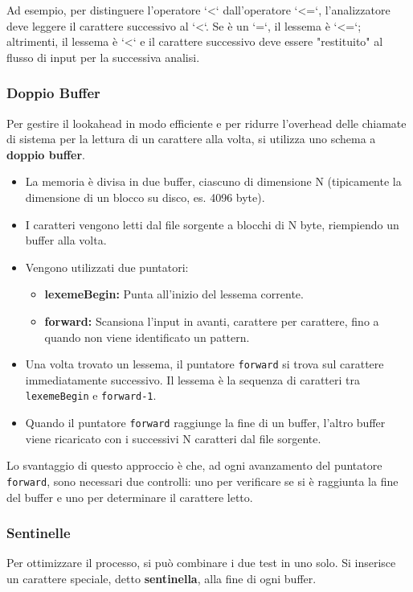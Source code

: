 Ad esempio, per distinguere l'operatore `<` dall'operatore `<=`, l'analizzatore deve leggere il carattere successivo al `<`. Se è un `=`, il lessema è `<=`; altrimenti, il lessema è `<` e il carattere successivo deve essere "restituito" al flusso di input per la successiva analisi.

\subsubsection{Doppio Buffer }
Per gestire il lookahead in modo efficiente e per ridurre l'overhead delle chiamate di sistema per la lettura di un carattere alla volta, si utilizza uno schema a \textbf{doppio buffer}.

\begin{itemize}
    \item La memoria è divisa in due buffer, ciascuno di dimensione N (tipicamente la dimensione di un blocco su disco, es. 4096 byte).
    \item I caratteri vengono letti dal file sorgente a blocchi di N byte, riempiendo un buffer alla volta.
    \item Vengono utilizzati due puntatori:
    \begin{itemize}
        \item \textbf{lexemeBegin:} Punta all'inizio del lessema corrente.
        \item \textbf{forward:} Scansiona l'input in avanti, carattere per carattere, fino a quando non viene identificato un pattern.
    \end{itemize}
    \item Una volta trovato un lessema, il puntatore \texttt{forward} si trova sul carattere immediatamente successivo. Il lessema è la sequenza di caratteri tra \texttt{lexemeBegin} e \texttt{forward-1}.
    \item Quando il puntatore \texttt{forward} raggiunge la fine di un buffer, l'altro buffer viene ricaricato con i successivi N caratteri dal file sorgente.
\end{itemize}

Lo svantaggio di questo approccio è che, ad ogni avanzamento del puntatore \texttt{forward}, sono necessari due controlli: uno per verificare se si è raggiunta la fine del buffer e uno per determinare il carattere letto.

\subsubsection{Sentinelle }
Per ottimizzare il processo, si può combinare i due test in uno solo. Si inserisce un carattere speciale, detto \textbf{sentinella}, alla fine di ogni buffer.

